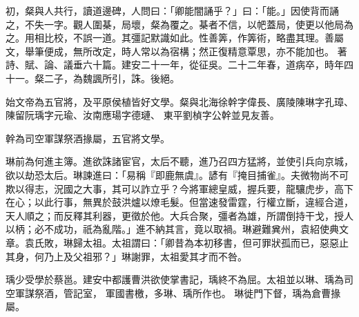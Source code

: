 \begin{pinyinscope}
初，粲與人共行，讀道邊碑，人問曰：「卿能闇誦乎？」曰：「能。」因使背而誦之，不失一字。觀人圍棊，局壞，粲為覆之。棊者不信，以帊蓋局，使更以他局為之。用相比校，不誤一道。其彊記默識如此。性善筭，作筭術，略盡其理。善屬文，舉筆便成，無所改定，時人常以為宿構；然正復精意覃思，亦不能加也。
著詩、賦、論、議垂六十篇。建安二十一年，從征吳。二十二年春，道病卒，時年四十一。粲二子，為魏諷所引，誅。後絕。


始文帝為五官將，及平原侯植皆好文學。粲與北海徐幹字偉長、廣陵陳琳字孔璋、陳留阮瑀字元瑜、汝南應瑒字德璉、
東平劉楨字公幹並見友善。


幹為司空軍謀祭酒掾屬，五官將文學。


琳前為何進主簿。進欲誅諸宦官，太后不聽，進乃召四方猛將，並使引兵向京城，欲以劫恐太后。琳諫進曰：「易稱『即鹿無虞』。諺有『掩目捕雀』。夫微物尚不可欺以得志，況國之大事，其可以詐立乎？今將軍總皇威，握兵要，龍驤虎步，高下在心；以此行事，無異於鼓洪爐以燎毛髮。但當速發雷霆，行權立斷，違經合道，天人順之；而反釋其利器，更徵於他。大兵合聚，彊者為雄，所謂倒持干戈，授人以柄；必不成功，祇為亂階。」進不納其言，竟以取禍。琳避難兾州，袁紹使典文章。袁氏敗，琳歸太祖。太祖謂曰：「卿昔為本初移書，但可罪狀孤而已，惡惡止其身，何乃上及父祖邪？」琳謝罪，太祖愛其才而不咎。


瑀少受學於蔡邕。建安中都護曹洪欲使掌書記，瑀終不為屈。太祖並以琳、瑀為司空軍謀祭酒，管記室，
軍國書檄，多琳、瑀所作也。
琳徙門下督，瑀為倉曹掾屬。



\end{pinyinscope}
